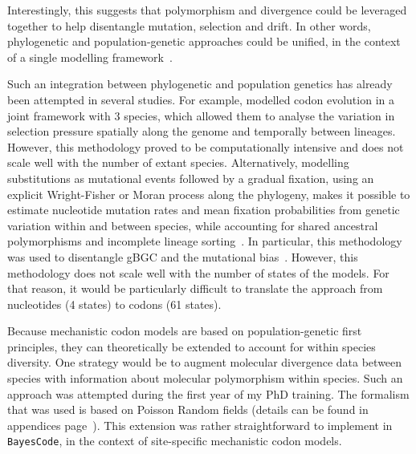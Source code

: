 Interestingly, this suggests that polymorphism and divergence could be leveraged together to help disentangle mutation, selection and drift.
In other words, phylogenetic and population-genetic approaches could be unified, in the context of a single modelling framework~\citep{Thorne2012}.

Such an integration between phylogenetic and population genetics has already been attempted in several studies.
For example, \citet{Wilson2011} modelled \gls{codon} evolution in a joint framework with $3$ species, which allowed them to analyse the variation in selection pressure spatially along the genome and temporally between lineages.
However, this methodology proved to be computationally intensive and does not scale well with the number of extant species.
Alternatively, modelling \glspl{substitution} as mutational events followed by a gradual fixation, using an explicit Wright-Fisher or Moran process along the phylogeny, makes it possible to estimate nucleotide mutation rates and mean fixation probabilities from genetic variation within and between species, while accounting for shared ancestral polymorphisms and incomplete lineage sorting~\citep{DeMaio2013, Schrempf2016, Bergman2018, Schrempf2019}.
In particular, this methodology was used to disentangle \acrshort{gBGC} and the mutational bias~\citep{Borges2019, Borges2020}.
However, this methodology does not scale well with the number of states of the models.
For that reason, it would be particularly difficult to translate the approach from nucleotides (4 states) to \glspl{codon} (61 states).

Because mechanistic \gls{codon} models are based on population-genetic first principles, they can theoretically be extended to account for within species diversity.
One strategy would be to augment molecular divergence data between species with information about molecular polymorphism within species.
Such an approach was attempted during the first year of my PhD training.
The formalism that was used is based on Poisson Random fields (details can be found in appendices page~\pageref{sec-appendix:PRF}).
This extension was rather straightforward to implement in \texttt{BayesCode}, in the context of site-specific mechanistic \gls{codon} models.

